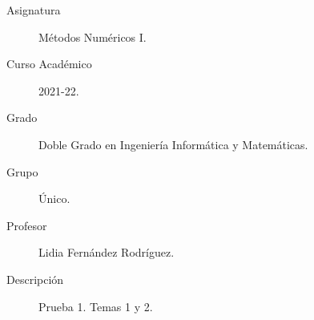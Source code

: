 \documentclass[12pt]{article}
\begin{document}

    
    

    \begin{description}
        \item[Asignatura] Métodos Numéricos I.
        \item[Curso Académico] 2021-22.
        \item[Grado] Doble Grado en Ingeniería Informática y Matemáticas.
        \item[Grupo] Único.
        \item[Profesor] Lidia Fernández Rodríguez.
        \item[Descripción] Prueba 1. Temas 1 y 2.
    
    \end{description}
    \newpage
    
\end{document}
